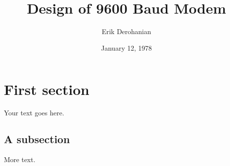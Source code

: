 \documentclass[twoside, 12pt]{report}
\title{Design of 9600 Baud Modem}
\author{Erik Derohanian}
\date{January 12, 1978}
\begin{document}
\maketitle

\section{First section}

Your text goes here.

\subsection{A subsection}

More text.
\end{document}
